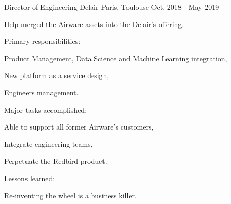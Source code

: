 \begin{cventries}
  \cventry
    {Director of Engineering} %
    {Delair} %
    {Paris, Toulouse} %
    {Oct. 2018 - May 2019} %
    {
      \begin{cvitems} %
        \item {Help merged the Airware assets into the Delair's offering.}
        \item {Primary responsibilities:}
        \begin{cvsubitems}
          \item {Product Management, Data Science and Machine Learning integration,}
          \item {New platform as a service design,}
          \item {Engineers management.}
        \end{cvsubitems}
        \item {Major tasks accomplished:}
        \begin{cvsubitems}
          \item {Able to support all former Airware's customers,}
          \item {Integrate engineering teams,}
          \item {Perpetuate the Redbird product.}
        \end{cvsubitems}
        \item {Lessons learned:}
        \begin{cvsubitems}
          \item {Re-inventing the wheel is a business killer.}
      \end{cvsubitems}
      \end{cvitems}
    }


\end{cventries}
